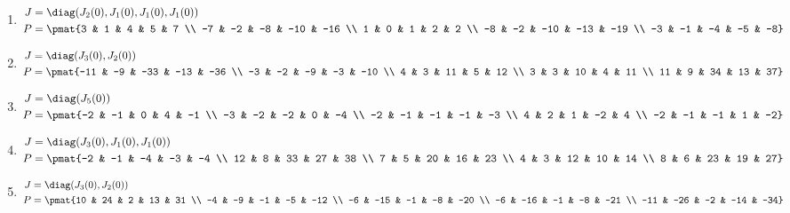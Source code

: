 \begin{enumerate}
\item

\begin{align*}
J &= \diag(J_{2}(0), J_{1}(0), J_{1}(0), J_{1}(0))\\
P &= \pmat{3 & 1 & 4 & 5 & 7 \\ -7 & -2 & -8 & -10 & -16 \\ 1 & 0 & 1 & 2 & 2 \\ -8 & -2 & -10 & -13 & -19 \\ -3 & -1 & -4 & -5 & -8}
\end{align*}

\item

\begin{align*}
J &= \diag(J_{3}(0), J_{2}(0))\\
P &= \pmat{-11 & -9 & -33 & -13 & -36 \\ -3 & -2 & -9 & -3 & -10 \\ 4 & 3 & 11 & 5 & 12 \\ 3 & 3 & 10 & 4 & 11 \\ 11 & 9 & 34 & 13 & 37}
\end{align*}

\item

\begin{align*}
J &= \diag(J_{5}(0))\\
P &= \pmat{-2 & -1 & 0 & 4 & -1 \\ -3 & -2 & -2 & 0 & -4 \\ -2 & -1 & -1 & -1 & -3 \\ 4 & 2 & 1 & -2 & 4 \\ -2 & -1 & -1 & 1 & -2}
\end{align*}

\item

\begin{align*}
J &= \diag(J_{3}(0), J_{1}(0), J_{1}(0))\\
P &= \pmat{-2 & -1 & -4 & -3 & -4 \\ 12 & 8 & 33 & 27 & 38 \\ 7 & 5 & 20 & 16 & 23 \\ 4 & 3 & 12 & 10 & 14 \\ 8 & 6 & 23 & 19 & 27}
\end{align*}

\item

\begin{align*}
J &= \diag(J_{3}(0), J_{2}(0))\\
P &= \pmat{10 & 24 & 2 & 13 & 31 \\ -4 & -9 & -1 & -5 & -12 \\ -6 & -15 & -1 & -8 & -20 \\ -6 & -16 & -1 & -8 & -21 \\ -11 & -26 & -2 & -14 & -34}
\end{align*}


\end{enumerate}

